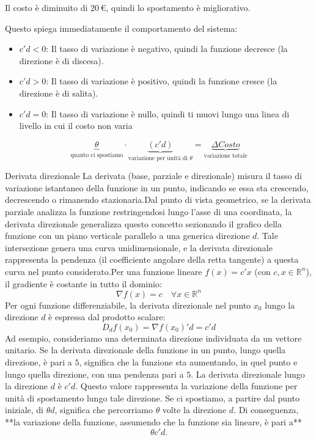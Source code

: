 Il costo è diminuito di \(20\,€\), quindi lo spostamento è migliorativo.

Questo spiega immediatamente il comportamento del sistema:
\begin{itemize}
    \item $c'd < 0$: Il tasso di variazione è negativo, quindi la funzione decresce (la direzione è di discesa).
    \item $c'd > 0$: Il tasso di variazione è positivo, quindi la funzione cresce (la direzione è di salita).
    \item $c'd = 0$: Il tasso di variazione è nullo, quindi ti muovi lungo una linea di livello in cui il costo non varia
\end{itemize}

\[
\underbrace{\theta}_{\text{quanto ci spostiamo}}
\cdot
\underbrace{(c'd)}_{\text{variazione per unità di }\theta}
=
\underbrace{\Delta Costo}_{\text{variazione totale}}
\]

\begin{observation}{Derivata direzionale}
La derivata (base, parziale e direzionale) misura il tasso di variazione istantaneo della funzione in un punto, indicando se essa sta crescendo, decrescendo o rimanendo stazionaria.Dal punto di vista geometrico, se la derivata parziale analizza la funzione restringendosi lungo l'asse di una coordinata, la derivata direzionale generalizza questo concetto sezionando il grafico della funzione con un piano verticale parallelo a una generica direzione $d$. Tale intersezione genera una curva unidimensionale, e la derivata direzionale rappresenta la pendenza (il coefficiente angolare della retta tangente) a questa curva nel punto considerato.Per una funzione lineare $f(x) = c'x$ (con $c, x \in \mathbb{R}^n$), il gradiente è costante in tutto il dominio:$$\nabla f(x) = c \quad \forall x \in \mathbb{R}^n$$Per ogni funzione differenziabile, la derivata direzionale nel punto $x_0$ lungo la direzione $d$ è espressa dal prodotto scalare:$$D_d f(x_0) = \nabla f(x_0)' d = c'd$$
Ad esempio, consideriamo una determinata direzione individuata da un vettore unitario. Se la derivata direzionale della funzione in un punto, lungo quella direzione, è pari a \(5\), significa che la funzione sta aumentando, in quel punto e lungo quella direzione, con una pendenza pari a \(5\). 
La derivata direzionale lungo la direzione \(d\) è \(c'd\). Questo valore rappresenta la variazione della funzione per unità di spostamento lungo tale direzione. Se ci spostiamo, a partire dal punto iniziale, di \(\theta d\), significa che percorriamo \(\theta\) volte la direzione \(d\). Di conseguenza, **la variazione della funzione, assumendo che la funzione sia lineare, è pari a**
\[
\theta c'd.
\]
\end{observation}


